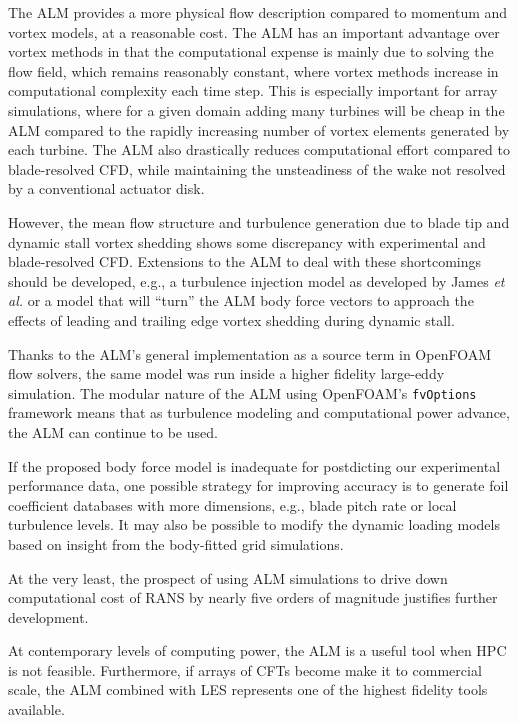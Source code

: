 The ALM provides a more physical flow description compared to momentum and
vortex models, at a reasonable cost. The ALM has an important advantage over
vortex methods in that the computational expense is mainly due to solving the
flow field, which remains reasonably constant, where vortex methods increase in
computational complexity each time step. This is especially important for array
simulations, where for a given domain adding many turbines will be cheap in the
ALM compared to the rapidly increasing number of vortex elements generated by
each turbine. The ALM also drastically reduces computational effort compared to
blade-resolved CFD, while maintaining the unsteadiness of the wake not resolved
by a conventional actuator disk.

However, the mean flow structure and turbulence generation due to blade tip and
dynamic stall vortex shedding shows some discrepancy with experimental and
blade-resolved CFD. Extensions to the ALM to deal with these shortcomings should
be developed, e.g., a turbulence injection model as developed by James \emph{et
    al.} \cite{James2010} or a model that will ``turn'' the ALM body force vectors
to approach the effects of leading and trailing edge vortex shedding during
dynamic stall.

Thanks to the ALM's general implementation as a source term in OpenFOAM flow
solvers, the same model was run inside a higher fidelity large-eddy simulation.
The modular nature of the ALM using OpenFOAM's \texttt{fvOptions} framework
means that as turbulence modeling and computational power advance, the ALM can
continue to be used.


If the proposed body force model is inadequate for postdicting our experimental
performance data, one possible strategy for improving accuracy is to generate
foil coefficient databases with more dimensions, e.g., blade pitch rate or local
turbulence levels. It may also be possible to modify the dynamic loading models
based on insight from the body-fitted grid simulations.


At the very least, the prospect of using ALM simulations to drive down
computational cost of RANS by nearly five orders of magnitude justifies further
development.

At contemporary levels of computing power, the ALM is a useful tool when HPC is
not feasible. Furthermore, if arrays of CFTs become make it to commercial scale,
the ALM combined with LES represents one of the highest fidelity tools
available.

